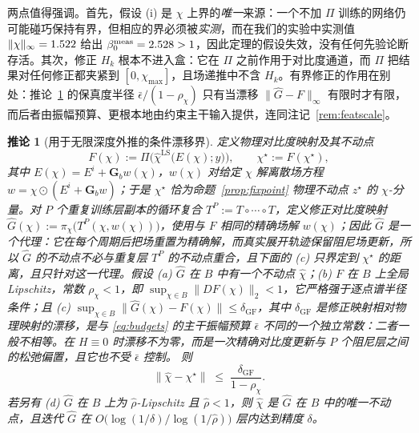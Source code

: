 \documentclass[UTF8,a4paper,11pt]{ctexart}
\newcommand{\norm}[1]{\lVert #1 \rVert}
\newcommand{\infn}[1]{\lVert #1 \rVert_{\infty}}
\newcommand{\numv}[1]{#1}
\newtheorem{Corollary}{推论}[section]
\begin{document}
两点值得强调。首先，假设 (i) 是 $\chi$ 上界的\emph{唯一}来源：一个不加 $\Pi$ 训练的网络仍可能碰巧保持有界，但相应的界必须被\emph{实测}，而在我们的实验中实测值 $\infn{\chi}=\numv{\NumMeasChiNoProj}$ 给出
$\beta_0^{\mathrm{meas}}=\numv{\NumBetaMeas}>1$，因此定理的假设失效，没有任何先验论断存活。其次，修正 $H_k$ 根本不进入盒：它在 $\Pi$ 之前作用于对比度通道，而 $\Pi$ 把结果对任何修正都夹紧到 $[0,\chi_{\max}]$，且场递推中不含 $H_k$。有界修正的作用在别处：推论~\ref{cor:fidelity} 的保真度半径 $\bar\epsilon/(1-\rho_\chi)$ 只有当漂移 $\norm{\hat G-F}_\infty$ 有限时才有限，而后者由振幅预算、更根本地由约束主干输入提供，连同注记~\ref{rem:featscale}。

\begin{Corollary}[用于无限深度外推的条件漂移界]\label{cor:fidelity}
定义\emph{物理对比度映射}及其不动点
\begin{equation}\label{eq:chistar}
F(\chi):=\Pi\big(\hat\chi^{\mathrm{LS}}\big(E(\chi);y\big)\big),\qquad
\chi^{\star}:=F(\chi^{\star}),
\end{equation}
其中 $E(\chi)=E^i+\mathbf{G}_b w(\chi)$，$w(\chi)$ 对给定 $\chi$ 解离散场方程
$w=\chi\odot(E^i+\mathbf{G}_b w)$；于是 $\chi^{\star}$ 恰为命题~\ref{prop:fixpoint} 物理不动点 $z^{\star}$ 的 $\chi$-分量。对 $P$ 个重复训练层副本的循环复合 $T^{P}:=T\circ\cdots\circ T$，定义\emph{修正对比度映射} $\hat G(\chi):=\pi_\chi\big(T^{P}(\chi,w(\chi))\big)$，使用与 $F$ 相同的精确场解 $w(\chi)$；因此 $\hat G$ 是一个\emph{代理}：它在每个周期后把场重置为精确解，而真实展开轨迹保留阻尼场更新，所以 $\hat G$ 的不动点不必与重复层 $T^P$ 的不动点重合，且下面的 (c) 只界定到 $\chi^\star$ 的距离，且只针对这一代理。假设
(a) $\hat G$ 在 $B$ 中有一个不动点 $\hat\chi$；(b) $F$ 在 $B$ 上全局 Lipschitz，常数 $\rho_\chi<1$，即 $\sup_{\chi\in B}\norm{DF(\chi)}_2<1$，它严格强于逐点谱半径条件；且 (c) $\sup_{\chi\in B}\norm{\hat G(\chi)-F(\chi)}\le\delta_{\mathrm{GF}}$，其中 $\delta_{\mathrm{GF}}$ 是修正映射相对物理映射的\emph{漂移}，是与 \eqref{eq:budgets} 的主干振幅预算 $\bar\epsilon$ 不同的一个\emph{独立}常数：二者一般不相等。在 $H\equiv0$ 时漂移不为零，而是一次精确对比度更新与 $P$ 个阻尼层之间的松弛偏置，且它也不受 $\bar\epsilon$ 控制。
则
\begin{equation}\label{eq:fidelity}
\norm{\hat\chi-\chi^{\star}}\;\le\;\frac{\delta_{\mathrm{GF}}}{1-\rho_\chi}.
\end{equation}
若另有 (d) $\hat G$ 在 $B$ 上为 $\hat\rho$-Lipschitz 且 $\hat\rho<1$，则 $\hat\chi$ 是 $\hat G$ 在 $B$ 中的唯一不动点，且迭代 $\hat G$ 在 $O\big(\log(1/\delta)/\log(1/\hat\rho)\big)$ 层内达到精度 $\delta$。
\end{Corollary}
\end{document}
